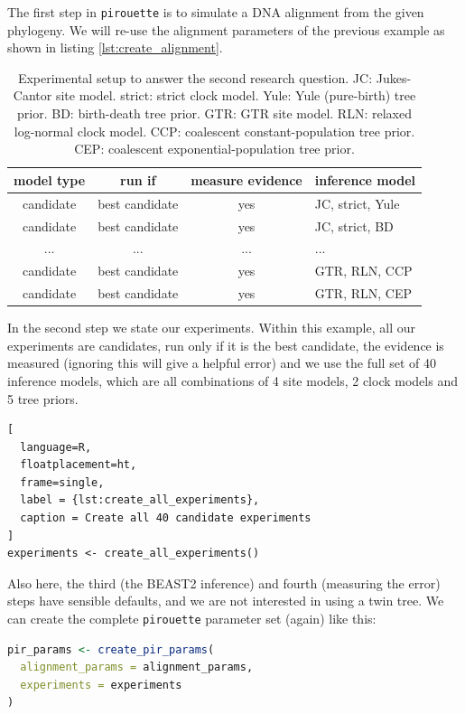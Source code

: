 \documentclass{article}
\begin{document}
The first step in \verb;pirouette; is to simulate a DNA alignment from the given phylogeny. 
We will re-use the alignment parameters of the previous example 
as shown in listing \ref{lst:create_alignment}.

\begin{table}
  \begin{tabular}{ | c | c | c | l | }
    \hline
    \textbf{model type} & \textbf{run if} & \textbf{measure evidence} & \textbf{inference model} \\ 
    \hline
    candidate & best candidate & yes & JC, strict, Yule \\
    candidate & best candidate & yes & JC, strict, BD   \\
    ...       & ...            & ... & ...              \\
    candidate & best candidate & yes & GTR, RLN, CCP    \\
    candidate & best candidate & yes & GTR, RLN, CEP    \\
    \hline
  \end{tabular}
  \caption{
    Experimental setup to answer the second research question.
    JC: Jukes-Cantor site model.
    strict: strict clock model.
    Yule: Yule (pure-birth) tree prior.
    BD: birth-death tree prior.
    GTR: GTR site model.
    RLN: relaxed log-normal clock model.
    CCP: coalescent constant-population tree prior.
    CEP: coalescent exponential-population tree prior.
  }
\end{table}

In the second step we state our experiments. 
Within this example, all our experiments are candidates,
run only if it is the best candidate, the evidence is measured (ignoring
this will give a helpful error) and we use the full set of 
40 inference models, which are all combinations of 4 site 
models, 2 clock models and 5 tree priors.

\begin{lstlisting}[
  language=R, 
  floatplacement=ht, 
  frame=single, 
  label = {lst:create_all_experiments},
  caption = Create all 40 candidate experiments
]
experiments <- create_all_experiments()
\end{lstlisting}

Also here, the third (the BEAST2 inference) and fourth (measuring the error)
steps have sensible defaults, and we are not
interested in using a twin tree. We can create the complete
\verb;pirouette; parameter set (again) like this:

\begin{lstlisting}[language=R, floatplacement=ht, frame=single]
pir_params <- create_pir_params(
  alignment_params = alignment_params,
  experiments = experiments
)
\end{lstlisting}
\end{document}
